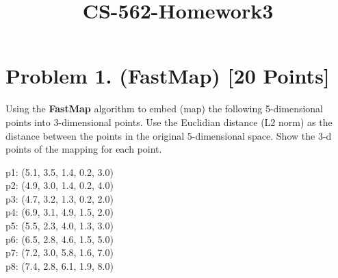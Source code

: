 \documentclass[11pt]{article}
\title{CS-562-Homework3}
\begin{document}
    
    \maketitle
    
    

    
    \hypertarget{problem-1.-fastmap-20-points}{%
\section{Problem 1. (FastMap) {[}20
Points{]}}\label{problem-1.-fastmap-20-points}}

Using the \textbf{FastMap} algorithm to embed (map) the following
5-dimensional points into 3-dimensional points. Use the Euclidian
distance (L2 norm) as the distance between the points in the original
5-dimensional space. Show the 3-d points of the mapping for each point.

p1: (5.1, 3.5, 1.4, 0.2, 3.0)\\
p2: (4.9, 3.0, 1.4, 0.2, 4.0)\\
p3: (4.7, 3.2, 1.3, 0.2, 2.0)\\
p4: (6.9, 3.1, 4.9, 1.5, 2.0)\\
p5: (5.5, 2.3, 4.0, 1.3, 3.0)\\
p6: (6.5, 2.8, 4.6, 1.5, 5.0)\\
p7: (7.2, 3.0, 5.8, 1.6, 7.0)\\
p8: (7.4, 2.8, 6.1, 1.9, 8.0)
\end{document}
